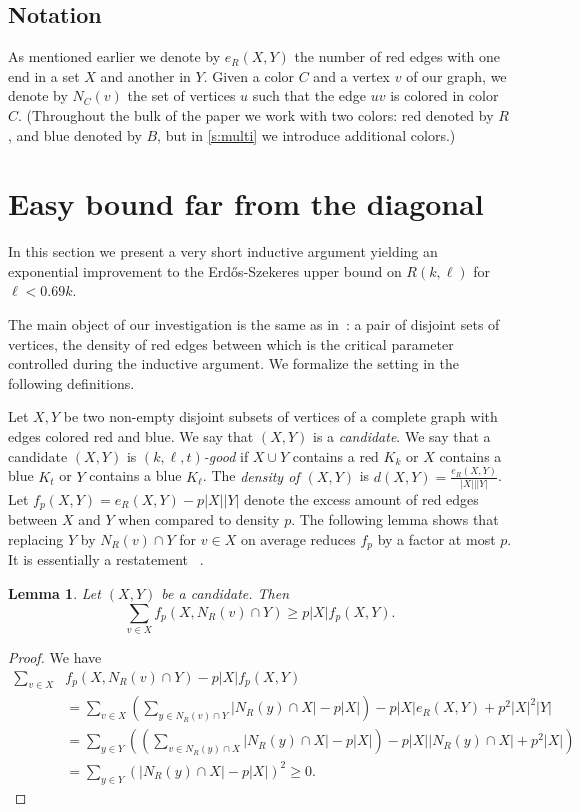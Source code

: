 \documentclass[reqno,final,12pt]{amsart}
\newtheorem{lem}[thm]{Lemma}
\newcommand{\s}[1]{\left(#1\right)}
\begin{document}
\subsection{Notation} As mentioned earlier we denote by $e_R(X,Y)$ the number of red edges with one end in a set  $X$  and another in $Y$. Given a color $C$ and a vertex $v$ of our graph, we denote by  $N_C(v)$  the set of vertices $u$ such that the edge $uv$ is colored in color $C$. (Throughout the bulk of the paper we work with two colors: red denoted by $R$, and blue denoted by $B$, but in \cref{s:multi} we introduce additional colors.) 

\section{Easy bound far from the diagonal}\label{s:easy}

In this section we present a very short inductive argument yielding an exponential improvement to the Erd\H{o}s-Szekeres upper bound on $R(k,\ell)$ for $\ell < 0.69k.$ 

The main object of our investigation is the same as in~\cite{CGMS23}: a pair of disjoint sets of vertices, the density of red edges between which is the critical parameter controlled during the inductive argument. We formalize the setting in the following definitions.

Let $X,Y$ be two non-empty disjoint subsets of vertices of a complete graph with edges colored red and blue. We say that $(X,Y)$ is a \emph{candidate}. We say that a candidate $(X,Y)$ is \emph{$(k,\ell,t)$-good} if $X \cup Y$ contains a red $K_k$ or $X$ contains a blue $K_t$ or $Y$ contains a blue $K_\ell$. The \emph{density of $(X,Y)$} is  $d(X,Y) = \frac{e_R(X,Y)}{|X|||Y|}$. 
Let $f_{p}(X,Y)=e_R(X,Y) - p|X||Y|$ denote the excess amount of red edges between $X$ and $Y$ when compared to density $p$. 
The following lemma shows that replacing $Y$  by $N_R(v) \cap Y$ for $v \in X$ on average  reduces $f_p$ by a factor at most $p$. It is essentially a restatement ~\cite[Observation 5.5]{CGMS23}.   

 \begin{lem}\label{l:FpAvg}
	Let $(X,Y)$ be a candidate. Then \begin{equation}
	\sum_{v\in X}f_p(X,N_R(v) \cap Y) \geq p|X|f_p(X,Y).
	\end{equation}
	
\end{lem}
\begin{proof}
	We have
	\begin{align*}
	\sum_{v\in X}&f_p(X,N_R(v) \cap Y) - p|X|f_p(X,Y) \\&= \sum_{v \in X} \s{\sum_{y \in N_R(v) \cap Y} |N_R(y) \cap X| - p|X| } -p|X|e_R(X,Y)+p^2|X|^2|Y| \\
	&= \sum_{y \in Y}\s{\s{\sum_{v \in N_R(y) \cap X} |N_R(y) \cap X| -p|X|} -p|X||N_R(y) \cap X| +p^2|X|} \\&=\sum_{y \in Y} \s{ |N_R(y) \cap X| -p|X|}^2 \geq 0.
	\end{align*}
\end{proof}	
\end{document}
